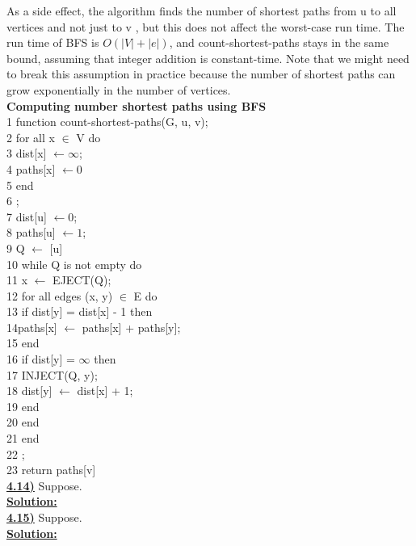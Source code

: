 \documentclass{article}
\begin{document}
As a side effect, the algorithm finds the number of shortest paths from u to all vertices and not just to v , but this does not affect the worst-case run time. The run time of BFS is $O(|V| + |e|)$, and count-shortest-paths stays in the same bound, assuming that integer addition is constant-time. Note that we might need to break this assumption in practice because the number of shortest paths can grow exponentially in the number of vertices. \\

\noindent \textbf{Computing number shortest paths using BFS} \\
1 function count-shortest-paths(G, u, v); \\
2 for all x $\in$ V do \\
3 \indent dist[x] $\leftarrow \infty$; \\
4 \indent paths[x] $\leftarrow 0$ \\
5 end \\
6 ; \\
7 dist[u] $\leftarrow 0$; \\
8 paths[u] $\leftarrow 1$; \\
9 Q $\leftarrow$ [u]\\
10 while Q is not empty do \\
11 \indent x $\leftarrow$ EJECT(Q); \\
12 \indent for all edges (x, y) $\in$ E do \\
13 \indent \indent if dist[y] = dist[x] - 1 then \\
14\indent \indent \indent paths[x] $\leftarrow$ paths[x] + paths[y]; \\
15 \indent \indent end \\
16 \indent \indent if dist[y] = $\infty$ then \\
17 \indent \indent \indent INJECT(Q, y); \\
18 \indent \indent \indent dist[y] $\leftarrow$ dist[x] + 1; \\
19 \indent \indent end \\
20 \indent end \\
21 end \\
22 ; \\
23 return paths[v] \\

\vspace{.2in}
\noindent \textbf{\underline{4.14)}} Suppose.\\

\noindent \textbf{\underline{Solution:}}  \\

\vspace{.2in}
\noindent \textbf{\underline{4.15)}} Suppose.\\

\noindent \textbf{\underline{Solution:}}  \\
\end{document}

